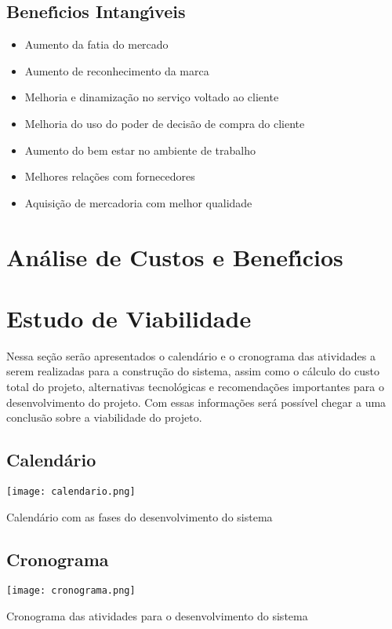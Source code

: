        \subsection{Benef\'{\i}cios Intang\'{\i}veis}
	\begin{itemize}
	\item Aumento da fatia do mercado
	\item Aumento de reconhecimento da marca 
	\item Melhoria e dinamização no serviço voltado ao cliente
	\item Melhoria do uso do poder de decisão de compra do cliente 
	\item Aumento do bem estar no ambiente de trabalho 
	\item Melhores relações com fornecedores
	\item Aquisição de mercadoria com melhor qualidade
         	\end{itemize}

\section{An\'{a}lise de Custos e Benef\'{\i}cios}




\section{Estudo de Viabilidade}
Nessa seção serão apresentados o calendário e o cronograma das atividades a serem realizadas para a construção do sistema, assim como o cálculo do custo total do projeto, alternativas tecnológicas e recomendações importantes para o desenvolvimento do projeto. Com essas informações será possível chegar a uma conclusão sobre a viabilidade do projeto.

       \subsection{Calend\'{a}rio }
       \begin{table}[H]
	    \begin{center}
	    \texttt{[image: calendario.png]}
	    \caption{Calendário com as fases do desenvolvimento do sistema} \label{tab:calend}
	    \end{center}
       \end{table} 

       \subsection{Cronograma }
       \begin{table}[H]
	    \begin{center}
	    \texttt{[image: cronograma.png]}
	    \caption{Cronograma das atividades para o desenvolvimento do sistema} \label{tab:crono}
	    \end{center}
       \end{table} 

